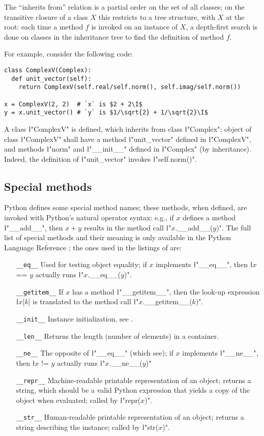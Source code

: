 The ``inherits from'' relation is a partial order on the set of all
classes; on the transitive closure of a class $X$ this restricts to a
tree structure, with $X$ at the root: each time a method $f$ is
invoked on an instance of $X$, a depth-first search is done on classes
in the inheritance tree to find the definition of method $f$.

For example, consider the following code:
\begin{lstlisting}
class ComplexV(Complex):
  def unit_vector(self):
    return ComplexV(self.real/self.norm(), self.imag/self.norm())

x = ComplexV(2, 2)  # `x` is $2 + 2\I$
y = x.unit_vector() # `y` is $1/\sqrt{2} + 1/\sqrt{2}\I$
\end{lstlisting}
A class \l"ComplexV" is defined, which inherits from class
\l"Complex"; object of class \l"ComplexV" shall have a method
\l"unit_vector" defined in \l"ComplexV", and  methods \l"norm" and
\l"__init__" defined in \l"Complex" (by inheritance).  Indeed, the
definition of \l"unit_vector" invokes \l"self.norm()".

\subsection{Special methods}
\label{sec:special-methods}

Python defines some special method names; these methods, when defined,
are invoked with Python's natural operator syntax: e.g., if $x$
defines a method \l"__add__", then $x + y$ results in the method call
\l"$x$.__add__($y$)".  The full list of special methods and their
meaning is only available in the Python Language Reference
\cite{python:reference}; the ones used in the listings of
 are:
\begin{itemize}
\item[{\tt \_\_eq\_\_}] Used for testing object equality; if $x$ implements
  \l"__eq__", then \l{$x$ == $y$} actually runs \l"$x$.__eq__($y$)".
\item[{\tt \_\_getitem\_\_}] If $x$ has a method \l"__getitem__", then the
  look-up expression \l{$x$[$k$]} is translated to the method call
  \l"$x$.__getitem__($k$)".
\item[{\tt \_\_init\_\_}] Instance initialization, see .
\item[{\tt \_\_len\_\_}] Returns the length (number of elements) in a
  container.
\item[{\tt \_\_ne\_\_}] The opposite of \l"__eq__" (which see); if $x$
  implements \l"__ne__", then \l{$x$ != $y$} actually runs
  \l"$x$.__ne__($y$)"
\item[{\tt \_\_repr\_\_}] Machine-readable printable representation of an
  object; returns a string, which should be a valid Python expression
  that yields a copy of the object when evaluated; called by
  \l"repr($x$)".
\item[{\tt \_\_str\_\_}] Human-readable printable representation of an
  object; returns a string describing the instance; called by
  \l"str($x$)".
\end{itemize}


